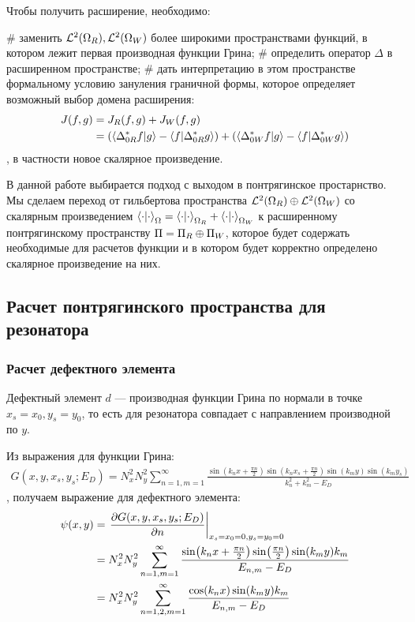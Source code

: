 Чтобы получить расширение, необходимо:
\begin{ilist}
# заменить $\mathcal{L}^2(\Omega_R), \mathcal{L}^2(\Omega_W)$ более широкими пространствами функций, в котором лежит первая производная функции Грина;
# определить оператор $\Delta$ в расширенном пространстве;
# дать интерпретацию в этом пространстве формальному условию зануления граничной формы, которое определяет возможный выбор домена расширения:
\begin{align*}
J(f, g)
& = J_R(f, g) + J_W(f, g) \\
& = (\ip{\Delta_{0R}^* f}{g} - \ip{f}{\Delta_{0R}^* g}) + (\ip{\Delta_{0W}^* f}{g} - \ip{f}{\Delta_{0W}^* g})
\end{align*}
, в частности новое скалярное произведение.
\end{ilist}
В данной работе выбирается подход с выходом в понтрягинское простарнство. Мы сделаем переход от гильбертова пространства $\mathcal{L}^2(\Omega_R) \oplus \mathcal{L}^2(\Omega_W)$ со скалярным произведением $\ipcdot_\Omega = \ipcdot_{\Omega_R} + \ipcdot_{\Omega_W}$ к расширенному понтрягинскому пространству $\Pi = \Pi_R \oplus \Pi_W$, которое будет содержать необходимые для расчетов функции и в котором будет корректно определено скалярное произведение на них.

\subsection{Расчет понтрягинского пространства для резонатора}
\subsubsection{Расчет дефектного элемента}
Дефектный элемент $d$ — производная функции Грина по нормали в точке $x_s = x_0, y_s = y_0$, то есть для резонатора совпадает с направлением производной по $y$.

Из выражения для функции Грина:
\begin{align*}
G(x, y, x_s, y_s; E_D) = N_x^2 N_y^2 \sum\limits_{n = 1, m = 1}^\infty \frac{\sin(k_n x + \frac{\pi n}{2}) \sin(k_n x_s  + \frac{\pi n}{2}) \sin(k_m y) \sin(k_m y_s)}{k_n^2 + k_m^2 - E_D}
\end{align*}
, получаем выражение для дефектного элемента:
\begin{align*}
\psi(x, y) 
&= \eval{\pdv{G(x, y, x_s, y_s; E_D)}{n}}_{x_s = x_0 = 0, y_s = y_0 = 0} \\
&= N_x^2 N_y^2 \sum\limits_{n = 1, m = 1}^\infty \frac{\sin(k_n x + \frac{\pi n}{2}) \sin(\frac{\pi n}{2}) \sin(k_m y) k_m}{E_{n, m} - E_D} \\
& = N_x^2 N_y^2 \sum\limits_{n = 1,2, m = 1}^\infty \frac{\cos(k_n x) \sin(k_m y) k_m}{E_{n, m} - E_D}
\end{align*}


